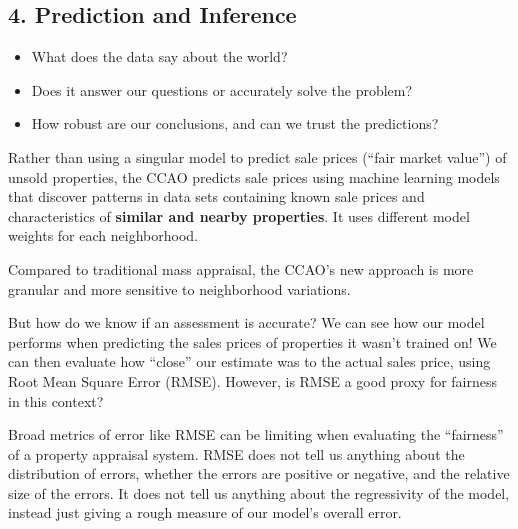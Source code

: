 \documentclass[
  letterpaper,
  DIV=11,
  numbers=noendperiod]{scrreprt}
\providecommand{\tightlist}{%
  \setlength{\itemsep}{0pt}\setlength{\parskip}{0pt}}\usepackage{longtable,booktabs,array}
\begin{document}
\subsection{4. Prediction and Inference}\label{prediction-and-inference}

\begin{tcolorbox}[enhanced jigsaw, arc=.35mm, colbacktitle=quarto-callout-note-color!10!white, coltitle=black, bottomrule=.15mm, leftrule=.75mm, bottomtitle=1mm, colback=white, toptitle=1mm, breakable, titlerule=0mm, rightrule=.15mm, colframe=quarto-callout-note-color-frame, opacitybacktitle=0.6, left=2mm, title=\textcolor{quarto-callout-note-color}{\faInfo}\hspace{0.5em}{Driving Questions}, toprule=.15mm, opacityback=0]

\begin{itemize}
\tightlist
\item
  What does the data say about the world?
\item
  Does it answer our questions or accurately solve the problem?
\item
  How robust are our conclusions, and can we trust the predictions?
\end{itemize}

\end{tcolorbox}

Rather than using a singular model to predict sale prices (``fair market
value'') of unsold properties, the CCAO predicts sale prices using
machine learning models that discover patterns in data sets containing
known sale prices and characteristics of \textbf{similar and nearby
properties}. It uses different model weights for each neighborhood.

Compared to traditional mass appraisal, the CCAO's new approach is more
granular and more sensitive to neighborhood variations.

But how do we know if an assessment is accurate? We can see how our
model performs when predicting the sales prices of properties it wasn't
trained on! We can then evaluate how ``close'' our estimate was to the
actual sales price, using Root Mean Square Error (RMSE). However, is
RMSE a good proxy for fairness in this context?

Broad metrics of error like RMSE can be limiting when evaluating the
``fairness'' of a property appraisal system. RMSE does not tell us
anything about the distribution of errors, whether the errors are
positive or negative, and the relative size of the errors. It does not
tell us anything about the regressivity of the model, instead just
giving a rough measure of our model's overall error.
\end{document}
